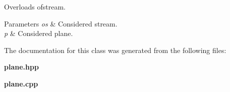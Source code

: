 Overloads ofstream. 


\begin{DoxyParams}{Parameters}
{\em os} & Considered stream. \\
\hline
{\em p} & Considered plane. \\
\hline
\end{DoxyParams}


The documentation for this class was generated from the following files\+:\begin{DoxyCompactItemize}
\item 
\textbf{ plane.\+hpp}\item 
\textbf{ plane.\+cpp}\end{DoxyCompactItemize}
